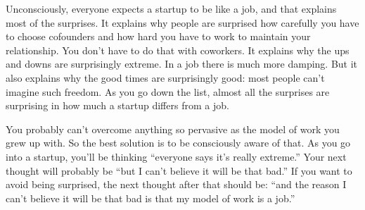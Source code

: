 Unconsciously, everyone expects a startup to be like a job, and that
explains most of the surprises. It explains why people are surprised how
carefully you have to choose cofounders and how hard you have to work to
maintain your relationship. You don't have to do that with coworkers. It
explains why the ups and downs are surprisingly extreme. In a job there
is much more damping. But it also explains why the good times are
surprisingly good: most people can't imagine such freedom. As you go
down the list, almost all the surprises are surprising in how much a
startup differs from a job.

You probably can't overcome anything so pervasive as the model of work
you grew up with. So the best solution is to be consciously aware of
that. As you go into a startup, you'll be thinking ``everyone says it's
really extreme.'' Your next thought will probably be ``but I can't
believe it will be that bad.'' If you want to avoid being surprised, the
next thought after that should be: ``and the reason I can't believe it
will be that bad is that my model of work is a job.''